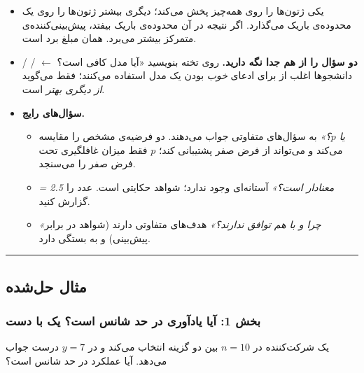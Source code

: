 \begin{itemize}
\tightlist
\item
  یکی ژتون‌ها را روی همه‌چیز پخش می‌کند؛ دیگری بیشتر ژتون‌ها را روی یک
  محدوده‌ی باریک می‌گذارد. اگر نتیجه در آن محدوده‌ی باریک بیفتد،
  پیش‌بینی‌کننده‌ی متمرکز بیشتر می‌برد.  همان مبلغ
  برد است.
\item
  \textbf{دو سؤال را از هم جدا نگه دارید.} روی تخته بنویسید «آیا مدل
  کافی است؟ \ensuremath{\leftarrow}  /  /  دانشجوها اغلب از 
  برای ادعای \emph{خوب} بودن یک مدل استفاده می‌کنند؛  فقط می‌گوید
  \emph{از دیگری بهتر} است.
\item
  \textbf{سؤال‌های رایج.}

  \begin{itemize}
  \tightlist
  \item
    \emph{ یا \(p\)؟»} به سؤال‌های متفاوتی جواب
    می‌دهند.  دو فرضیه‌ی مشخص را مقایسه می‌کند و می‌تواند از فرض صفر
    پشتیبانی کند؛ \(p\) فقط میزان غافلگیری تحت فرض صفر را
    می‌سنجد.
  \item
    \emph{ = 2.5 معنادار است؟»} آستانه‌ای وجود ندارد؛ شواهد
    حکایتی  است. عدد را گزارش کنید.
  \item
    \emph{«چرا  و  با هم توافق ندارند؟»} هدف‌های متفاوتی
    دارند (شواهد در برابر پیش‌بینی) و  به  بستگی دارد.
  \end{itemize}
\end{itemize}

\begin{center}\rule{0.5\linewidth}{0.5pt}\end{center}


\subsection{مثال حل‌شده}

\subsubsection{\texorpdfstring{بخش 1: آیا یادآوری در حد شانس است؟ یک
 با
دست}{بخش 1: آیا یادآوری در حد شانس است؟ یک Bayes factor با دست}}

یک شرکت‌کننده در \(n = 10\)  بین دو گزینه انتخاب می‌کند و در
\(y = 7\)  درست جواب می‌دهد. آیا عملکرد در حد شانس است؟

